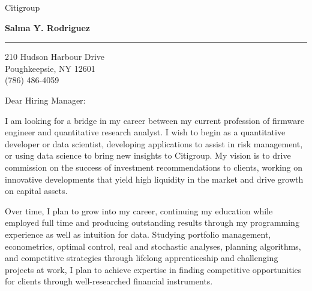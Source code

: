 \documentclass[11pt]{letter} %
\begin{document}

\begin{letter}{
Citigroup
} 


\begin{center}
\large\bf Salma Y. Rodriguez \\ %
\vspace{20pt} \hrule height 1pt %
210 Hudson Harbour Drive \\ Poughkeepsie, NY 12601 \\ (786) 486-4059 %
\end{center}



\opening{Dear Hiring Manager:}

I am looking for a bridge in my career between my current profession of firmware engineer and quantitative research analyst. I wish to begin as a quantitative developer or data scientist, developing applications to assist in risk management, or using data science to bring new insights to Citigroup. My vision is to drive commission on the success of investment recommendations to clients, working on innovative developments that yield high liquidity in the market and drive growth on capital assets.

Over time, I plan to grow into my career, continuing my education while employed full time and producing outstanding results through my programming experience as well as intuition for data. Studying portfolio management, econometrics, optimal control, real and stochastic analyses, planning algorithms, and competitive strategies through lifelong apprenticeship and challenging projects at work, I plan to achieve expertise in finding competitive opportunities for clients through well-researched financial instruments.


\end{letter}
\end{document}
